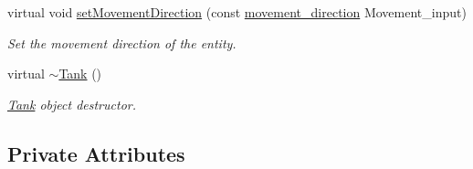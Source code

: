 \begin{DoxyCompactItemize}
virtual void \hyperlink{classTank_ae283f9665d114b742cb521acbf0897fe}{set\-Movement\-Direction} (const \hyperlink{Structures_8h_a0d0b88f27f3adf9452879b5d9f829026}{movement\-\_\-direction} Movement\-\_\-input)
\begin{DoxyCompactList}\small\item\em Set the movement direction of the entity. \end{DoxyCompactList}\item 
virtual \hyperlink{classTank_a9e4fce49ae7fe871894c1a3122c10269}{$\sim$\-Tank} ()
\begin{DoxyCompactList}\small\item\em \hyperlink{classTank}{Tank} object destructor. \end{DoxyCompactList}\end{DoxyCompactItemize}
\subsection*{Private Attributes}
